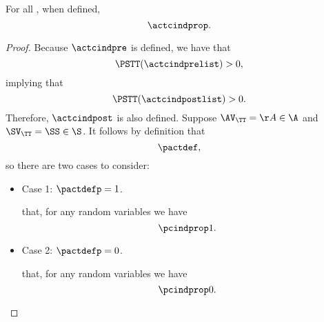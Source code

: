 \begin{proposition}
  For all \actcindrange, when defined,
  $$\actcindprop.$$%
\end{proposition}

\begin{proof}
  Because $\actcindpre$ is defined,
  we have that 
  $$\PSTT(\actcindprelist) > 0,$$ 
  implying that
  $$\PSTT(\actcindpostlist) > 0.$$
  Therefore,
  $\actcindpost$ is also defined.
  Suppose 
  $\AV_\TT = \AA \in \A$
  and
  $\SV_\TT = \SS \in \S$.
  It follows by definition that 
  $$\pactdef,$$
  so there are two cases to consider:
  \begin{itemize}
    \item Case 1: $\pactdefp = 1$.

       that,
      for any random variables 
      \listrv
      we have
      $$\pcindprop1.$$

    \item Case 2: $\pactdefp = 0$.

       that,
      for any random variables 
      \listrv
      we have
      $$\pcindprop0.$$
  \end{itemize}
\end{proof}
